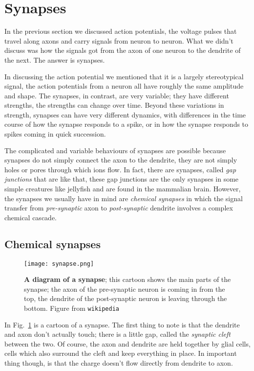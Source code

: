 \documentclass[12pt]{article}
\begin{document}
\section*{Synapses}

In the previous section we discussed action potentials, the voltage
pulses that travel along axons and carry signals from neuron to
neuron. What we didn't discuss was how the signals got from the axon
of one neuron to the dendrite of the next. The answer is synapses. 

In discussing the action potential we mentioned that it is a largely
stereotypical signal, the action potentials from a neuron all have
roughly the same amplitude and shape. The synapses, in contrast, are
very variable; they have different strengths, the strengths can change
over time. Beyond these variations in strength, synapses can have very
different dynamics, with differences in the time course of how the
synapse responds to a spike, or in how the synapse responds to spikes
coming in quick succession.

The complicated and variable behaviours of synapses are possible
because synapses do not simply connect the axon to the dendrite, they
are not simply holes or pores through which ions flow. In fact, there
are synapses, called \textsl{gap junctions} that are like that, these
gap junctions are the only synapses in some simple creatures like
jellyfish and are found in the mammalian brain. However, the synapses
we usually have in mind are \textsl{chemical synapses} in which the
signal transfer from \textsl{pre-synaptic} axon to
\textsl{post-synaptic} dendrite involves a complex chemical cascade.


\subsection*{Chemical synapses} 

\begin{figure}[tbhp]
  \begin{center}
    \texttt{[image: synapse.png]}
    \end{center}
  \caption{\textbf{A diagram of a synapse}; this cartoon shows the
    main parts of the synapse; the axon of the pre-synaptic neuron is
    coming in from the top, the dendrite of the post-synaptic neuron
    is leaving through the bottom. Figure from
    \texttt{wikipedia}\label{fig_synapse}}
\end{figure}

In Fig.~\ref{fig_synapse} is a cartoon of a synapse. The first thing
to note is that the dendrite and axon don't actually touch; there is a
little gap, called the \textsl{synaptic cleft} between the two. Of
course, the axon and dendrite are held together by glial cells, cells
which also surround the cleft and keep everything in place. In
important thing though, is that the charge doesn't flow directly from dendrite to axon.
\end{document}
